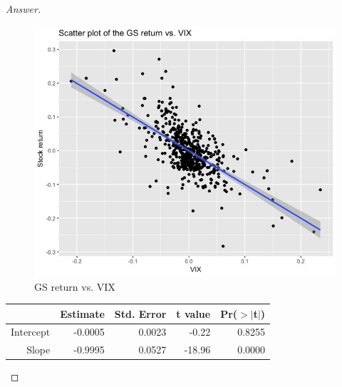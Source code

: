 \documentclass[10pt]{article}
\begin{document}
\begin{enumerate}
\begin{enumerate}
\begin{proof}[Answer]
        \begin{figure}[ht]
            \centering
            \includegraphics[scale = 0.45]{Q1c.jpeg}
            \caption{GS return vs. VIX}
        \end{figure}
        
        \begin{table}[h]
\centering
\begin{tabular}{rrrrr}
  \hline
 & Estimate & Std. Error & t value & Pr($>$$|$t$|$) \\ 
  \hline
Intercept & -0.0005 & 0.0023 & -0.22 & 0.8255 \\ 
 Slope & -0.9995 & 0.0527 & -18.96 & 0.0000 \\ 
   \hline
\end{tabular}
\end{table}

        \end{proof}
    \end{enumerate}
    
  
    \newpage
    

\end{enumerate}
\end{document}
